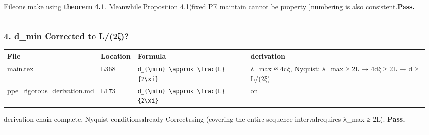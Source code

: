 \documentclass[
  12pt,
]{article}
\begin{document}
Fileone make using  \textbf{theorem  4.1}. Meanwhile Proposition 4.1(fixed  PE
maintain cannot be property )numbering is also consistent.\textbf{Pass.}

\begin{center}\rule{0.5\linewidth}{0.5pt}\end{center}

\subsubsection{4. d\_min Corrected to
L/(2ξ)?}\label{d_min-ux662fux5426ux4feeux6b63ux4e3a-l2ux3be}

\begin{longtable}[]{@{}
  >{\raggedright\arraybackslash}p{}
  >{\raggedright\arraybackslash}p{}
  >{\raggedright\arraybackslash}p{}
  >{\raggedright\arraybackslash}p{}@{}}
\toprule\noalign{}
\begin{minipage}[b]{\linewidth}\raggedright
File
\end{minipage} & \begin{minipage}[b]{\linewidth}\raggedright
Location
\end{minipage} & \begin{minipage}[b]{\linewidth}\raggedright
Formula
\end{minipage} & \begin{minipage}[b]{\linewidth}\raggedright
derivation
\end{minipage} \\
\midrule\noalign{}
\endhead
\bottomrule\noalign{}
\endlastfoot
main.tex & L368 &
\texttt{d\_\{\textbackslash{}min\}\ \textbackslash{}approx\ \textbackslash{}frac\{L\}\{2\textbackslash{}xi\}}
& λ\_max ≈ 4dξ, Nyquist: λ\_max ≥ 2L → 4dξ ≥ 2L → d ≥ L/(2ξ) \\
ppe\_rigorous\_derivation.md & L173 &
\texttt{d\_\{\textbackslash{}min\}\ \textbackslash{}approx\ \textbackslash{}frac\{L\}\{2\textbackslash{}xi\}}
& on  \\
\end{longtable}

derivation chain complete, Nyquist conditionsalready Correctusing (covering the entire sequence intervalrequires  λ\_max ≥
2L). \textbf{Pass.}

\begin{center}\rule{0.5\linewidth}{0.5pt}\end{center}
\end{document}
